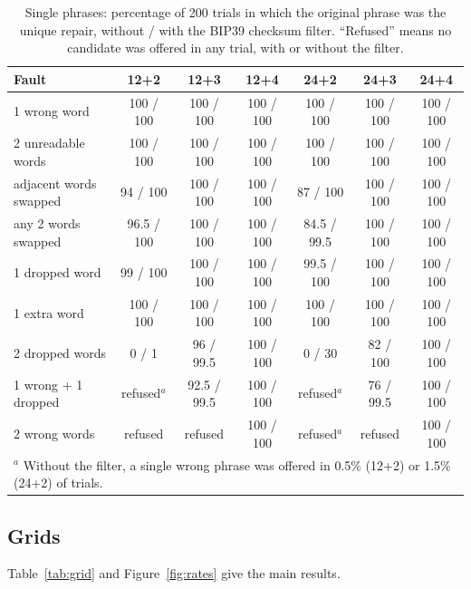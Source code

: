 \documentclass[numeric]{anvil-paper}
\begin{document}
\begin{table}[tb]
\centering
\caption{Single phrases: percentage of 200 trials in which the original phrase
was the unique repair, without / with the BIP39 checksum filter. ``Refused''
means no candidate was offered in any trial, with or without the filter.}
\label{tab:single}
\small
\begin{tabular}{lcccccc}
\toprule
Fault & 12+2 & 12+3 & 12+4 & 24+2 & 24+3 & 24+4 \\
\midrule
1 wrong word & 100 / 100 & 100 / 100 & 100 / 100 & 100 / 100 & 100 / 100 & 100 / 100 \\
2 unreadable words & 100 / 100 & 100 / 100 & 100 / 100 & 100 / 100 & 100 / 100 & 100 / 100 \\
adjacent words swapped & 94 / 100 & 100 / 100 & 100 / 100 & 87 / 100 & 100 / 100 & 100 / 100 \\
any 2 words swapped & 96.5 / 100 & 100 / 100 & 100 / 100 & 84.5 / 99.5 & 100 / 100 & 100 / 100 \\
1 dropped word & 99 / 100 & 100 / 100 & 100 / 100 & 99.5 / 100 & 100 / 100 & 100 / 100 \\
1 extra word & 100 / 100 & 100 / 100 & 100 / 100 & 100 / 100 & 100 / 100 & 100 / 100 \\
2 dropped words & 0 / 1 & 96 / 99.5 & 100 / 100 & 0 / 30 & 82 / 100 & 100 / 100 \\
1 wrong + 1 dropped & refused$^{a}$ & 92.5 / 99.5 & 100 / 100 & refused$^{a}$ & 76 / 99.5 & 100 / 100 \\
2 wrong words & refused & refused & 100 / 100 & refused$^{a}$ & refused & 100 / 100 \\
\bottomrule
\multicolumn{7}{l}{\footnotesize $^{a}$ Without the filter, a single wrong phrase
was offered in 0.5\% (12+2) or 1.5\% (24+2) of trials.}
\end{tabular}
\end{table}

\subsection{Grids}

Table~\ref{tab:grid} and Figure~\ref{fig:rates} give the main results.
\end{document}
